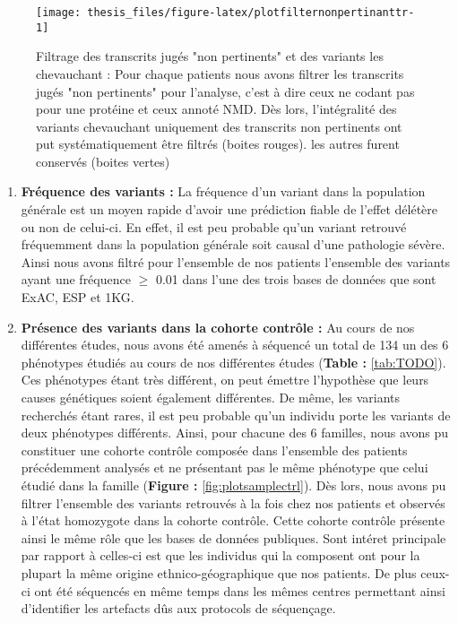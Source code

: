 \documentclass[12pt,twoside]{reedthesis}
\providecommand{\tightlist}{%
  \setlength{\itemsep}{0pt}\setlength{\parskip}{0pt}}
\theoremstyle{definition}
\theoremstyle{definition}
\theoremstyle{remark}
\begin{document}
  \begin{figure}
  
  {\centering \texttt{[image: thesis\_files/figure-latex/plotfilternonpertinanttr-1]} 
  
  }
  
  \caption[Filtrage des transcrits jugés "non pertinents" et des variants les chevauchant]{Filtrage des transcrits jugés "non pertinents" et des variants les chevauchant : Pour chaque patients nous avons filtrer les transcrits jugés "non pertinents" pour l'analyse, c'est à dire ceux ne codant pas pour une protéine et ceux annoté NMD. Dès lors, l'intégralité des variants chevauchant uniquement des transcrits non pertinents ont put systématiquement être filtrés (boites rouges). les autres furent conservés (boites vertes)}\label{fig:plotfilternonpertinanttr}
  \end{figure}
  
  \begin{enumerate}
  \def\labelenumi{\arabic{enumi}.}
  \setcounter{enumi}{4}
  \tightlist
  \item
    \textbf{Fréquence des variants :} La fréquence d'un variant dans la
    population générale est un moyen rapide d'avoir une prédiction fiable
    de l'effet délétère ou non de celui-ci. En effet, il est peu probable
    qu'un variant retrouvé fréquemment dans la population générale soit
    causal d'une pathologie sévère. Ainsi nous avons filtré pour
    l'ensemble de nos patients l'ensemble des variants ayant une fréquence
    \(\ge\) 0.01 dans l'une des trois bases de données que sont ExAC, ESP
    et 1KG.\\
  \item
    \textbf{Présence des variants dans la cohorte contrôle :} Au cours de
    nos différentes études, nous avons été amenés à séquencé un total de
    134 un des 6 phénotypes étudiés au cours de nos différentes études
    (\textbf{Table : }\ref{tab:TODO}). Ces phénotypes étant très
    différent, on peut émettre l'hypothèse que leurs causes génétiques
    soient également différentes. De même, les variants recherchés étant
    rares, il est peu probable qu'un individu porte les variants de deux
    phénotypes différents. Ainsi, pour chacune des 6 familles, nous avons
    pu constituer une cohorte contrôle composée dans l'ensemble des
    patients précédemment analysés et ne présentant pas le même phénotype
    que celui étudié dans la famille (\textbf{Figure :}
    \ref{fig:plotsamplectrl}). Dès lors, nous avons pu filtrer l'ensemble
    des variants retrouvés à la fois chez nos patients et observés à
    l'état homozygote dans la cohorte contrôle. Cette cohorte contrôle
    présente ainsi le même rôle que les bases de données publiques. Sont
    intéret principale par rapport à celles-ci est que les individus qui
    la composent ont pour la plupart la même origine ethnico-géographique
    que nos patients. De plus ceux-ci ont été séquencés en même temps dans
    les mêmes centres permettant ainsi d'identifier les artefacts dûs aux
    protocols de séquençage.
  \end{enumerate}
  
\end{document}

